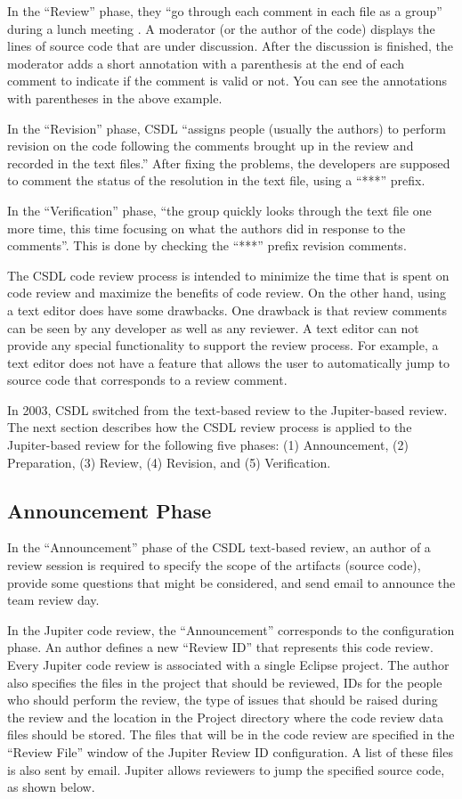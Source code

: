In the ``Review'' phase, they ``go through each comment in each file as a group'' during a lunch meeting \cite{wiegers:seven}. A moderator (or the author of the code) displays the lines of source code that are under discussion. After the discussion is finished, the moderator adds a short annotation with a parenthesis at the end of each comment to indicate if the comment is valid or not. You can see the annotations with parentheses in the above example.

In the ``Revision'' phase, CSDL ``assigns people (usually the authors) to perform revision on the code following the comments brought up in the review and recorded in the text files.'' After fixing the problems, the developers are supposed to comment the status of the resolution in the text file, using a ``***'' prefix.

In the ``Verification'' phase, ``the group quickly looks through the text file one more time, this time focusing on what the authors did in response to the comments''. This is done by checking the ``***'' prefix revision comments.

The CSDL code review process is intended to minimize the time that is spent on code review and maximize the benefits of code review. On the other hand, using a text editor does have some drawbacks. One drawback is that review comments can be seen by any developer as well as any reviewer. A text editor can not provide any special functionality to support the review process. For example, a text editor does not have a feature that allows the user to automatically jump to source code that corresponds to a review comment.

In 2003, CSDL switched from the text-based review to the Jupiter-based review. The next section describes how the CSDL review process is applied to the Jupiter-based review for the following five phases: (1) Announcement, (2) Preparation, (3) Review, (4) Revision, and (5) Verification.

\subsection{Announcement Phase}
\label{subsec:announcement-phase}

In the ``Announcement'' phase of the CSDL text-based review, an author of a review session is required to specify the scope of the artifacts (source code), provide some questions that might be considered, and send email to announce the team review day.

In the Jupiter code review, the ``Announcement'' corresponds to the configuration phase. An author defines a new ``Review ID'' that represents this code review. Every Jupiter code review is associated with a single Eclipse project. The author also specifies the files in the project that should be reviewed, IDs for the people who should perform the review, the type of issues that should be raised during the review and the location in the Project directory where the code review data files should be stored. The files that will be in the code review are specified in the ``Review File'' window of the Jupiter Review ID configuration. A list of these files is also sent by email. Jupiter allows reviewers to jump the specified source code, as shown below.

